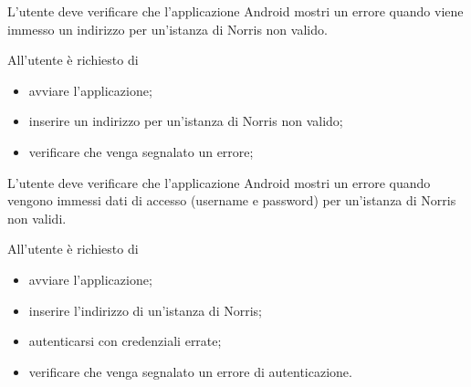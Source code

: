 	L'utente deve verificare che l'applicazione Android mostri un errore quando viene immesso un indirizzo per un'istanza di Norris non valido.

		All'utente è richiesto di
		\begin{itemize}
			\item avviare l'applicazione;
			\item inserire un indirizzo per un'istanza di Norris non valido;
			\item verificare che venga segnalato un errore;
		\end{itemize}

	L'utente deve verificare che l'applicazione Android mostri un errore quando vengono immessi dati di accesso (username e password) per un'istanza di Norris non validi.

		All'utente è richiesto di
		\begin{itemize}
			\item avviare l'applicazione;
			\item inserire l'indirizzo di un'istanza di Norris;
			\item autenticarsi con credenziali errate;
			\item verificare che venga segnalato un errore di autenticazione.
		\end{itemize}